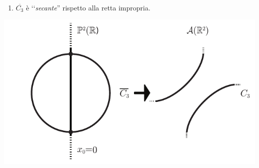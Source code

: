 \begin{examples}
\begin{minipage}{0.52\textwidth}
	\end{minipage}\\
	\begin{minipage}{0.57\textwidth}
	\begin{enumerate}[resume=proj2]
		\item $\overline{C_3}$ è ‘‘\textit{secante}'' rispetto alla retta impropria.
	\end{enumerate}
\end{minipage}
\begin{minipage}{0.52\textwidth}
					\includegraphics[trim=0cm 0cm 0cm 0cm,clip,scale=0.50]{images/projconic3.pdf}
\end{minipage}
\end{examples}
